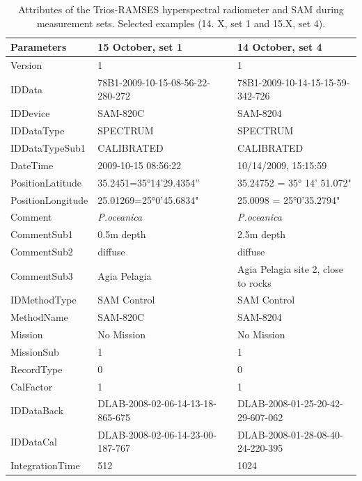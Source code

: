 \documentclass[11pt]{article}
\begin{document}
\begin{appendices}
\begin{table}[H]\footnotesize
	\caption{Attributes of the Trios-RAMSES hyperspectral radiometer and \ac{SAM} during measurement sets. Selected examples (14. X, set 1 and 15.X, set 4).}\label{tab:A.1}
	\centering
	  \begin{tabular}{| p{3cm} | p{3cm} | p{5cm} |}
		\hline
		    \textbf{Parameters} & \textbf{15 October, set 1} & \textbf{14 October, set 4} \\ \hline \hline
		     Version &1 & 1 \\ \hline
		     IDData & 78B1-2009-10-15-08-56-22-280-272 & 78B1-2009-10-14-15-15-59-342-726 \\ \hline
		     IDDevice & SAM-820C & SAM-8204\\ \hline
		     IDDataType & SPECTRUM & SPECTRUM \\ \hline
		     IDDataTypeSub1 & CALIBRATED & CALIBRATED \\ \hline
		     DateTime & 2009-10-15 08:56:22 & 10/14/2009, 15:15:59 \\ \hline
		     PositionLatitude & 35.2451=35°14'29.4354” & 35.24752 = 35° 14' 51.072" \\ \hline
		     PositionLongitude & 25.01269=25°0'45.6834" & 25.0098 = 25°0'35.2794" \\ \hline
		     Comment & \textit{P.oceanica} & \textit{P.oceanica} \\ \hline
		     CommentSub1 & 0.5m depth & 2.5m depth \\ \hline
		     CommentSub2 & diffuse & diffuse \\ \hline
		     CommentSub3 & Agia Pelagia & Agia Pelagia site 2, close to rocks \\ \hline
		     IDMethodType & SAM Control & SAM Control \\ \hline
		    MethodName & SAM-820C & SAM-8204 \\ \hline
		    Mission & No Mission & No Mission \\ \hline
		    MissionSub & 1 & 1 \\ \hline
		    RecordType & 0 & 0 \\ \hline
		    CalFactor & 1 & 1 \\ \hline
		   IDDataBack & DLAB-2008-02-06-14-13-18-865-675 & DLAB-2008-01-25-20-42-29-607-062 \\ \hline
		   IDDataCal & DLAB-2008-02-06-14-23-00-187-767 & DLAB-2008-01-28-08-40-24-220-395 \\ \hline
		   IntegrationTime & 512 & 1024 \\ \hline

\end{tabular}
\end{table}
\end{appendices}
\end{document}
